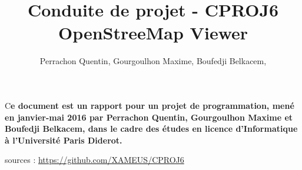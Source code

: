 \documentclass[DIV=calc, paper=a4, fontsize=11pt, french]{scrartcl}	 %
\title{Conduite de projet - CPROJ6\\ OpenStreeMap Viewer} %
\author{Perrachon Quentin, Gourgoulhon Maxime, Boufedji Belkacem, } %
\date{} %
\newcommand{\initial}[1]{ %
\lettrine[lines=3,lhang=0.3,nindent=0em]{
\color{c1}
{\textsf{#1}}}{}}
\begin{document}
\maketitle %

\thispagestyle{fancy} %


\initial{C}\textbf{e document est un rapport pour un projet de programmation,
mené en janvier-mai 2016 par Perrachon Quentin, Gourgoulhon Maxime et Boufedji Belkacem,
dans le cadre des études en licence d'Informatique à l'Université Paris Diderot.}

\vspace{\fill}
\tableofcontents

\vspace{1cm}
sources : \url{https://github.com/XAMEUS/CPROJ6}

\newpage











\end{document}
